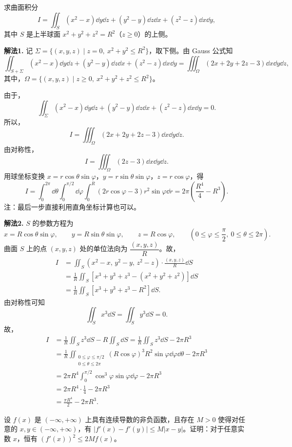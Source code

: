 求曲面积分
\[ I=\iint_S(x^2-x)\dd y\dd z+(y^2-y)\dd z\dd x+(z^2-z)\dd x\dd y, \]
其中 $S$ 是上半球面 $x^2+y^2+z^2=R^2$（$z\ge0$）的上侧。

\begin{solution}
\textbf{解法1.} 记 $\Sigma=\{(x,y,z)\mid z=0,\ x^2+y^2\le R^2\}$，取下侧。由 Gauss 公式知
\[ \iint_{S+\Sigma}(x^2-x)\dd y\dd z+(y^2-y)\dd z\dd x+(z^2-z)\dd x\dd y=\iiint_\Omega(2x+2y+2z-3)\dd x\dd y\dd z, \]
其中，$\Omega=\{(x,y,z)\mid z\ge0,\ x^2+y^2+z^2\le R^2\}$。

由于，
\[ \iint_\Sigma(x^2-x)\dd y\dd z+(y^2-y)\dd z\dd x+(z^2-z)\dd x\dd y=0. \]
所以，
\[ I=\iiint_\Omega(2x+2y+2z-3)\dd x\dd y\dd z. \]
由对称性，
\[ I=\iiint_\Omega(2z-3)\dd x\dd y\dd z. \]
用球坐标变换 $x=r\cos\theta\sin\varphi$，$y=r\sin\theta\sin\varphi$，$z=r\cos\varphi$，得
\[ I=\int_0^{2\pi}\dd\theta\int_0^{\pi/2}\dd\varphi\int_0^R(2r\cos\varphi-3)r^2\sin\varphi\dd r=2\pi\left(\frac{R^4}{4}-R^3\right). \]
注：最后一步直接利用直角坐标计算也可以。

\textbf{解法2.} $S$ 的参数方程为
\[ x=R\cos\theta\sin\varphi,\qquad y=R\sin\theta\sin\varphi,\qquad z=R\cos\varphi,\qquad \left(0\le\varphi\le\frac{\pi}{2},\ 0\le\theta\le2\pi\right). \]
曲面 $S$ 上的点 $(x,y,z)$ 处的单位法向为 $\dfrac{(x,y,z)}{R}$。故，
\begin{align*}
I &= \iint_S(x^2-x,\,y^2-y,\,z^2-z)\cdot\frac{(x,y,z)}{R}\dd S\\
&= \frac{1}{R}\iint_S\left[x^3+y^3+z^3-(x^2+y^2+z^2)\right]\dd S\\
&= \frac{1}{R}\iint_S\left[x^3+y^3+z^3-R^2\right]\dd S.
\end{align*}
由对称性可知
\[ \iint_S x^3\dd S=\iint_S y^3\dd S=0. \]
故，
\begin{align*}
I &= \frac{1}{R}\iint_S z^3\dd S-R\iint_S\dd S=\frac{1}{R}\iint_S z^3\dd S-2\pi R^3\\
&= \frac{1}{R}\iint_{\substack{0\le\varphi\le\pi/2\\ 0\le\theta\le2\pi}}(R\cos\varphi)^3R^2\sin\varphi\dd\varphi\dd\theta-2\pi R^3\\
&= 2\pi R^4\int_0^{\pi/2}\cos^3\varphi\sin\varphi\dd\varphi-2\pi R^3\\
&= 2\pi R^4\cdot\frac{1}{4}-2\pi R^3\\
&= \frac{\pi R^4}{2}-2\pi R^3.
\end{align*}
\end{solution}

设 $f(x)$ 是 $(-\infty,+\infty)$ 上具有连续导数的非负函数，且存在 $M>0$ 使得对任意的 $x,y\in(-\infty,+\infty)$，有 $|f'(x)-f'(y)|\le M|x-y|$。证明：对于任意实数 $x$，恒有 $(f'(x))^2\le2Mf(x)$。

